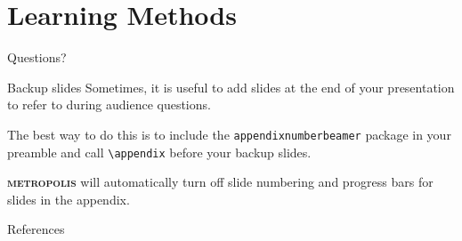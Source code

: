 \documentclass[10pt]{beamer}
\newcommand{\themename}{\textbf{\textsc{metropolis}}\xspace}
\begin{document}


\section{Learning Methods}



\begin{frame}[standout]
  Questions?
\end{frame}

\appendix

\begin{frame}[fragile]{Backup slides}
  Sometimes, it is useful to add slides at the end of your presentation to
  refer to during audience questions.

  The best way to do this is to include the \verb|appendixnumberbeamer|
  package in your preamble and call \verb|\appendix| before your backup slides.

  \themename will automatically turn off slide numbering and progress bars for
  slides in the appendix.
\end{frame}

\begin{frame}[allowframebreaks]{References}

  
  

\end{frame}
\end{document}

